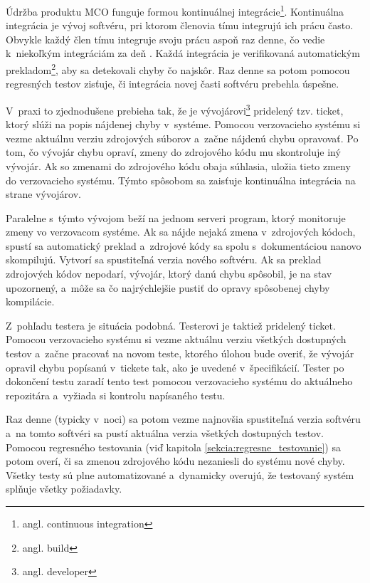 Údržba produktu MCO funguje formou kontinuálnej 
integrácie\footnote{angl. continuous integration}.
Kontinuálna integrácia je vývoj softvéru, pri ktorom členovia tímu integrujú
ich prácu často. Obvykle každý člen tímu integruje svoju prácu aspoň 
raz denne, čo vedie k~niekoľkým integráciám za deň 
\cite{Continuous_integration}.
Každá integrácia je verifikovaná automatickým 
prekladom\footnote{angl. build}, aby sa detekovali chyby čo najskôr. 
Raz denne sa potom pomocou regresných testov zisťuje,
či integrácia novej časti softvéru prebehla úspešne.

V~praxi to zjednodušene prebieha tak, že je vývojárovi\footnote{angl. developer}
pridelený tzv. ticket, ktorý slúži na popis nájdenej chyby v~systéme. 
Pomocou verzovacieho systému si vezme aktuálnu verziu zdrojových súborov 
a~začne nájdenú chybu opravovať.
Po tom, čo vývojár chybu opraví, zmeny do zdrojového kódu mu skontroluje 
iný vývojár. Ak so zmenami do zdrojového kódu obaja súhlasia, uložia 
tieto zmeny do verzovacieho systému. Týmto spôsobom sa zaisťuje 
kontinuálna integrácia na strane vývojárov.

Paralelne s~týmto vývojom beží na jednom serveri program, ktorý 
monitoruje zmeny vo verzovacom systéme. Ak sa nájde nejaká zmena 
v~zdrojových kódoch, spustí sa automatický preklad a~zdrojové kódy sa 
spolu s~dokumentáciou nanovo skompilujú. Vytvorí sa spustiteľná verzia 
nového softvéru. Ak sa preklad zdrojových kódov nepodarí, vývojár, ktorý 
danú chybu spôsobil, je na stav upozornený, a~môže sa čo najrýchlejšie 
pustiť do opravy spôsobenej chyby kompilácie.

Z~pohľadu testera je situácia podobná. Testerovi je taktiež pridelený 
ticket. Pomocou verzovacieho systému si vezme aktuálnu verziu
všetkých dostupných testov a~začne pracovať na novom teste, ktorého úlohou bude 
overiť, že vývojár opravil chybu popísanú v~tickete tak, ako je 
uvedené v~špecifikácií.
Tester po dokončení testu zaradí tento test pomocou verzovacieho 
systému do aktuálneho repozitára a~vyžiada si kontrolu napísaného testu. 

Raz denne (typicky v~noci) sa potom vezme najnovšia spustiteľná verzia 
softvéru a~na tomto softvéri sa pustí aktuálna verzia všetkých dostupných 
testov. Pomocou regresného testovania 
(viď kapitola \ref{sekcia:regresne_testovanie}) sa potom overí, či sa 
zmenou zdrojového kódu nezaniesli do systému nové chyby. 
Všetky testy sú plne automatizované a~dynamicky overujú, že testovaný 
systém splňuje všetky požiadavky.


